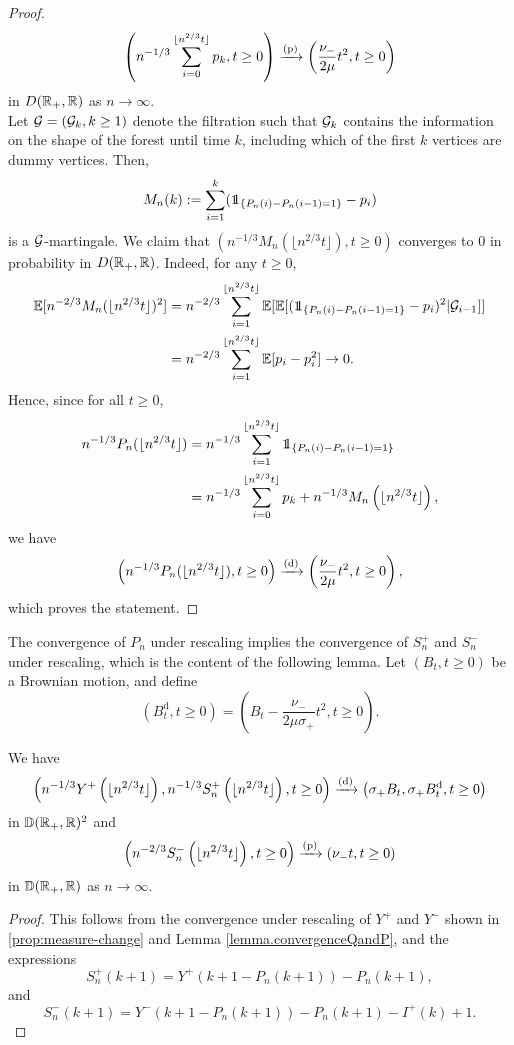 \begin{proof}
$$\left(n^{-1/3}\sum_{i=0}^{\lfloor n^{2/3}t \rfloor} p_k , t \geq 0\right)\xrightarrow[]{\mathrm{(p)}} \left(\frac{\nu_-}{2\mu}t^2,t\geq 0\right)$$
in $D({\mathbb R}_+,{\mathbb R})$ as $n\to \infty$. \\
Let ${\mathcal G}=({\mathcal G}_k,k\geq 1)$ denote the filtration such that ${\mathcal G}_{k}$ contains the information on the shape of the forest until time $k$, including which of the first $k$ vertices are dummy vertices. Then, 
$$M_n(k):=\sum_{i=1}^k (\one_{\{P_n(i)-P_n(i-1)=1\}}-p_i)$$ is a ${\mathcal G}$-martingale. We claim that $(n^{-1/3}M_n(\lfloor n^{2/3} t\rfloor ), t\geq 0)$ converges to $0$ in probability in $D({\mathbb R}_+,{\mathbb R})$. Indeed, for any $t\geq 0$,
\begin{align*}\E[n^{-2/3}M_n(\lfloor n^{2/3} t\rfloor )^2]&=n^{-2/3}\sum_{i=1}^{\lfloor n^{2/3} t\rfloor} \E[\E[(\one_{\{P_n(i)-P_n(i-1)=1\}}-p_i)^2|\cG_{i-1}]]\\&=n^{-2/3}\sum_{i=1}^{\lfloor n^{2/3} t\rfloor} \E[p_i-p_i^2]\to 0.\end{align*}
Hence, since for all $t\geq 0$,
\begin{align*}n^{-1/3}P_n(\lfloor n^{2/3}t\rfloor)&=n^{-1/3}\sum_{i=1}^{\lfloor n^{2/3}t\rfloor}  \one_{\{P_n(i)-P_n(i-1)=1\}}\\
&= n^{-1/3}\sum_{i=0}^{\lfloor n^{2/3}t \rfloor} p_k + n^{-1/3} M_n\left(\lfloor n^{2/3}t\rfloor\right),
\end{align*}
we have
$$\left(n^{-1/3}P_n(\lfloor n^{2/3}t\rfloor),t\geq 0\right)\xrightarrow[]{\mathrm{(d)}}  \left( \frac{\nu_-}{2\mu}t^2, t\geq 0 \right),$$
 which proves the statement.

\end{proof}

The convergence of $P_n$ under rescaling implies the convergence of $S^{+}_n$ and $S^{-}_n$ under rescaling, which is the content of the following lemma. Let $(B_t,t\geq 0)$ be a Brownian motion, and define 
$$({B}^{\mathrm{d}}_t,t\geq 0)=\left(B_t-\frac{\nu_-}{2\mu\sigma_+}t^2,t\geq 0\right).$$ 

\begin{lemma}
\label{lem:lukasiewiczpathpurplevertices}
 We have 
 \begin{align*}\left(n^{-1/3}Y^{+}\left(\lfloor n^{2/3}t\rfloor\right), n^{-1/3}S^{+}_n\left(\lfloor n^{2/3}t\rfloor\right), t\geq 0\right)\xrightarrow[]{\mathrm{(d)}}\left(\sigma_+B_t,\sigma_+B^{\mathrm{d}}_t,  t\geq 0\right)\end{align*}
 in ${\mathbb D}({\mathbb R}_+,{\mathbb R})^2$  and 
 $$\left(n^{-2/3}S^{-}_n\left(\lfloor n^{2/3}t\rfloor\right),t\geq 0\right)\xrightarrow[]{\mathrm{(p)}}\left(\nu_- t,t\geq 0\right)$$
 in ${\mathbb D}({\mathbb R}_+,{\mathbb R})$ as $n\to\infty$.
\end{lemma}
\begin{proof}
 This follows from the convergence under rescaling of $Y^+$ and $Y^-$ shown in \cref{prop:measure-change} and Lemma \ref{lemma.convergenceQandP}, and the expressions 
 $$S_n^{+}(k+1)=Y^+\left(k+1-P_n(k+1)\right)-P_n(k+1),$$ and $$S_n^{-}(k+1)=Y^-\left(k+1-P_n(k+1)\right)-P_n(k+1)-I^{+}(k)+1.$$
\end{proof}


